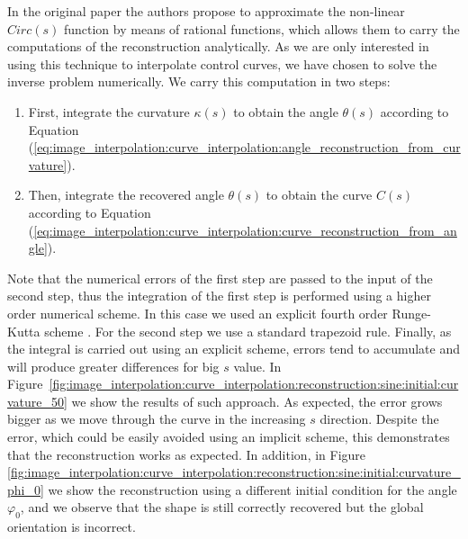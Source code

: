 \documentclass{ipol}
\newcommand{\req}[1]{(\ref{#1})}
\begin{document}
In the original paper the authors propose to approximate the non-linear $Circ(s)$ function by means of rational functions, which allows them to carry the computations of the reconstruction analytically. As we are only interested in using this technique to interpolate control curves, we have chosen to solve the inverse problem numerically. We carry this computation in two steps:
\begin{enumerate}
	\item First, integrate the curvature $\kappa(s)$ to obtain the angle $\theta(s)$ according to Equation  \req{eq:image_interpolation:curve_interpolation:angle_reconstruction_from_curvature}.
	\item Then, integrate the recovered angle $\theta(s)$ to obtain the curve $C(s)$ according to Equation \req{eq:image_interpolation:curve_interpolation:curve_reconstruction_from_angle}.
\end{enumerate} 
Note that the numerical errors of the first step are passed to the input of the second step, thus the integration of the first step is performed using a higher order numerical scheme. In this case we used an explicit fourth order Runge-Kutta scheme \cite{math:numerical:dormand:1980:a_family_of_embedded_runge_kutta}. For the second step we use a standard trapezoid rule.
Finally, as the integral is carried out using an explicit scheme, errors tend to accumulate and will produce greater differences for  big $s$ value. In Figure~\ref{fig:image_interpolation:curve_interpolation:reconstruction:sine:initial:curvature_50} we show the results of such approach. As expected, the error grows bigger as we move through the curve in the increasing $s$ direction. 
Despite the error, which could be easily avoided using an implicit scheme, this demonstrates that the reconstruction works as expected. In addition, in Figure \ref{fig:image_interpolation:curve_interpolation:reconstruction:sine:initial:curvature_phi_0} we show the reconstruction using a different initial condition for the angle $\varphi_0$, and we observe that the shape is still correctly recovered but the global orientation is incorrect.
\end{document}

